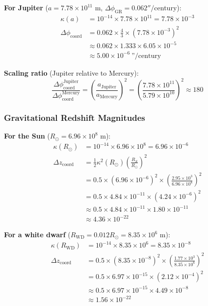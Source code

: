\documentclass[11pt,a4paper]{article}
\begin{document}
\textbf{For Jupiter} ($a = 7.78 \times 10^{11}$ m, $\Delta\phi_{\text{GR}} = 0.062''/$century):
\begin{align}
	\kappa(a) &= 10^{-14} \times 7.78 \times 10^{11} = 7.78 \times 10^{-3} \\
	\Delta\phi_{\text{coord}} &= 0.062 \times \frac{4}{3} \times (7.78 \times 10^{-3})^2 \\
	&\approx 0.062 \times 1.333 \times 6.05 \times 10^{-5} \\
	&\approx 5.00 \times 10^{-6}~\text{''}/\text{century}
\end{align}

\textbf{Scaling ratio} (Jupiter relative to Mercury):
\begin{equation}
	\frac{\Delta\phi_{\text{coord}}^{\text{Jupiter}}}{\Delta\phi_{\text{coord}}^{\text{Mercury}}}
	= \left(\frac{a_{\text{Jupiter}}}{a_{\text{Mercury}}}\right)^2 
	= \left(\frac{7.78 \times 10^{11}}{5.79 \times 10^{10}}\right)^2 \approx 180
\end{equation}

\subsubsection{Gravitational Redshift Magnitudes}

\textbf{For the Sun} ($R_\odot = 6.96 \times 10^8$ m):
\begin{align}
	\kappa(R_\odot) &= 10^{-14} \times 6.96 \times 10^8 = 6.96 \times 10^{-6} \\
	\Delta z_{\text{coord}} &= \frac{1}{2} \kappa^2(R_\odot) \left(\frac{R_S}{R_\odot}\right)^2 \\
	&= 0.5 \times (6.96 \times 10^{-6})^2 \times \left(\frac{2.95 \times 10^3}{6.96 \times 10^8}\right)^2 \\
	&= 0.5 \times 4.84 \times 10^{-11} \times (4.24 \times 10^{-6})^2 \\
	&\approx 0.5 \times 4.84 \times 10^{-11} \times 1.80 \times 10^{-11} \\
	&\approx 4.36 \times 10^{-22}
\end{align}

\textbf{For a white dwarf} ($R_{\text{WD}} = 0.012 R_\odot = 8.35 \times 10^6$ m):
\begin{align}
	\kappa(R_{\text{WD}}) &= 10^{-14} \times 8.35 \times 10^6 = 8.35 \times 10^{-8} \\
	\Delta z_{\text{coord}} &= 0.5 \times (8.35 \times 10^{-8})^2 \times \left(\frac{1.77 \times 10^3}{8.35 \times 10^6}\right)^2 \\
	&= 0.5 \times 6.97 \times 10^{-15} \times (2.12 \times 10^{-4})^2 \\
	&\approx 0.5 \times 6.97 \times 10^{-15} \times 4.49 \times 10^{-8} \\
	&\approx 1.56 \times 10^{-22}
\end{align}
\end{document}
